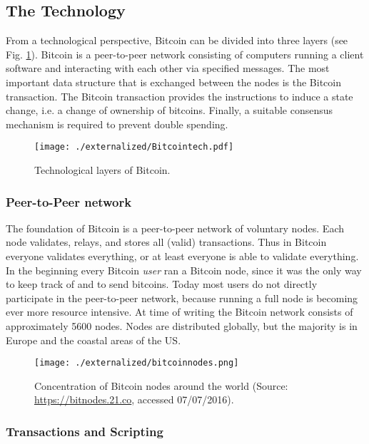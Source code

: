 \subsection{The Technology}
\label{sec:btc_tech}

From a technological perspective, Bitcoin can be divided into three layers (see Fig. \ref{fig:btclayers}). Bitcoin is a peer-to-peer network consisting of computers running a client software and interacting with each other via specified messages. The most important data structure that is exchanged between the nodes is the Bitcoin transaction. The Bitcoin transaction provides the instructions to induce a state change, i.e. a change of ownership of bitcoins. Finally, a suitable consensus mechanism is required to prevent double spending. 

\begin{figure}
\centering
\texttt{[image: ./externalized/Bitcointech.pdf]}
\caption{Technological layers of Bitcoin.}
\label{fig:btclayers}
\end{figure}


\subsubsection{Peer-to-Peer network}
\label{sec:p2p}

The foundation of Bitcoin is a peer-to-peer network of voluntary nodes. Each node validates, relays, and stores all (valid) transactions. Thus in Bitcoin everyone validates everything, or at least everyone is able to validate everything. In the beginning every Bitcoin \emph{user} ran a Bitcoin node, since it was the only way to keep track of and to send bitcoins. Today most users do not directly participate in the peer-to-peer network, because running a full node is becoming ever more resource intensive. At time of writing the Bitcoin network consists of approximately 5600 nodes. Nodes are distributed globally, but the majority is in Europe and the coastal areas of the US. 

\begin{figure}
\centering
\texttt{[image: ./externalized/bitcoinnodes.png]}
\caption{Concentration of Bitcoin nodes around the world (Source: \url{https://bitnodes.21.co}, accessed 07/07/2016).}
\label{fig:bitcointx}
\end{figure}


\subsubsection{Transactions and Scripting}
\label{sec:tx}

